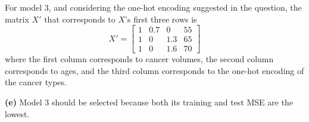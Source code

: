 \documentclass[leqno]{article}
\begin{document}
For model 3, and considering the one-hot encoding suggested in the question, the matrix $X'$ that corresponds to $X$'s first three rows is
\[
X'=
  \begin{bmatrix}
    1 & 0.7 & 0 & 55\\
    1 & 0 & 1.3 & 65 \\
    1 & 0 & 1.6 & 70
  \end{bmatrix}
\]
where the first column corresponds to cancer volumes, the second column corresponds to ages, and the third column corresponds to the one-hot encoding 
of the cancer types.

\hfill

\textbf{(e)} Model 3 should be selected because both its training and test MSE are the lowest.
\end{document}
